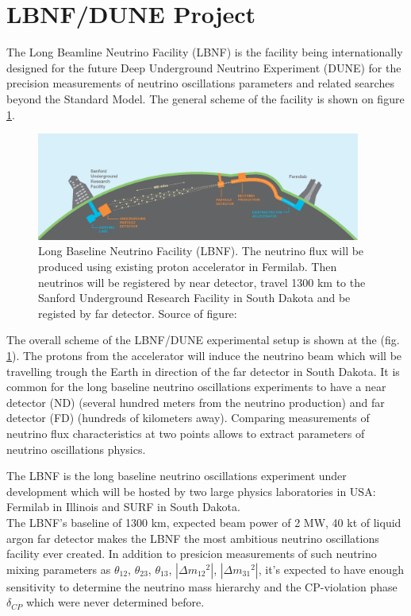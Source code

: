 
\section{LBNF/DUNE Project}

The Long Beamline Neutrino Facility (LBNF) is the facility being internationally designed for the future Deep Underground Neutrino Experiment (DUNE) for the precision measurements of neutrino oscillations parameters and related searches beyond the Standard Model. The general scheme of the facility is shown on figure \ref{fig:LBNF_overallScheme}. 


\begin{figure}
\caption{Long Baseline Neutrino Facility (LBNF). The neutrino flux will be produced using existing proton accelerator in Fermilab. Then neutrinos will be registered by near detector, travel 1300 km to the Sanford Underground Research Facility in South Dakota and be registed by far detector. Source of figure: \cite{ref_LBNFweb} }
\label{fig:LBNF_overallScheme}
\centering
\includegraphics[width=0.95\textwidth, keepaspectratio=true]{figs/LBNF_overallScheme.png} 
\end{figure}

The overall scheme of the LBNF/DUNE experimental setup is shown at the (fig. \ref{fig:LBNF_overallScheme}). The protons from the accelerator  will induce the neutrino beam which will be travelling trough the Earth in direction of the far detector in South Dakota. It is common for the long baseline neutrino oscillations experiments to have a near detector (ND) (several hundred meters from the neutrino production) and far detector (FD) (hundreds of kilometers away). Comparing measurements of neutrino flux characteristics at two points allows to extract parameters of neutrino oscillations physics.








The LBNF is the long baseline neutrino oscillations experiment under development which will be hosted by two large physics laboratories in USA: Fermilab in Illinois and SURF in South Dakota. \\  

The LBNF's baseline of 1300 km, expected beam power of 2 MW, 40 kt of liquid argon far detector makes the LBNF the most ambitious neutrino oscillations facility ever created. In addition to presicion measurements of such neutrino mixing parameters as $\theta_{12}$, $\theta_{23}$, $\theta_{13}$, $|\Delta{m_{12}}^2|$, $|\Delta{m_{31}}^2|$, it's expected to have enough sensitivity to determine the neutrino mass hierarchy and the CP-violation phase $\delta_{CP}$ which were never determined before.\\
